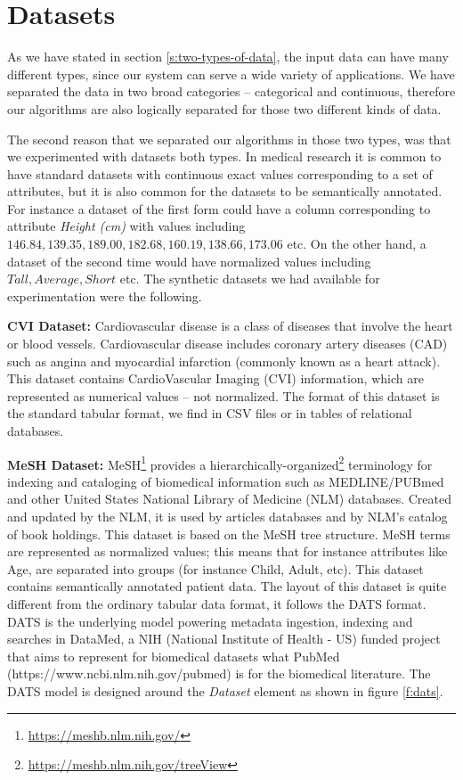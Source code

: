\section{Datasets  }\label{s:datasets}
As we have stated in section \ref{s:two-types-of-data}, the input data can have many different types, since our system can serve a wide variety of applications.
We have separated the data in two broad categories -- categorical and continuous, therefore our algorithms are also logically separated for those two different kinds of data.

The second reason that we separated our algorithms in those two types, was that we experimented with datasets both types.
In medical research it is common to have standard datasets with continuous exact values corresponding to a set of attributes, but it is also common for the datasets to be semantically annotated.
For instance a dataset of the first form could have a column corresponding to attribute \textit{Height (cm)} with values including $146.84, 139.35, 189.00, 182.68, 160.19, 138.66, 173.06$ etc.
On the other hand, a dataset of the second time would have normalized values including $Tall, Average, Short$ etc.
The synthetic datasets we had available for experimentation were the following.

\textbf{CVI Dataset:}
Cardiovascular disease is a class of diseases that involve the heart or blood vessels.
Cardiovascular disease includes coronary artery diseases (CAD) such as angina and myocardial infarction (commonly known as a heart attack).
This dataset contains CardioVascular Imaging (CVI) information, which are represented as numerical values – not normalized.
The format of this dataset is the standard tabular format, we find in CSV files or in tables of relational databases.

\textbf{MeSH Dataset:}
MeSH\footnote{\href{https://meshb.nlm.nih.gov/}{https://meshb.nlm.nih.gov/}} provides a hierarchically-organized\footnote{\href{https://meshb.nlm.nih.gov/treeView}{https://meshb.nlm.nih.gov/treeView}} terminology for indexing and cataloging of biomedical information such as MEDLINE/PUBmed and other United States National Library of Medicine (NLM) databases.
Created and updated by the NLM, it is used by articles databases and by NLM's catalog of book holdings.
This dataset is based on the MeSH tree structure.
MeSH terms are represented as normalized values; this means that for instance attributes like Age, are separated into groups (for instance Child, Adult, etc).
This dataset contains semantically annotated patient data.
The layout of this dataset is quite different from the ordinary tabular data format, it follows the DATS format.
DATS is the underlying model powering metadata ingestion, indexing and searches in DataMed, a NIH (National Institute of Health - US) funded project that aims to represent for biomedical datasets what PubMed (https://www.ncbi.nlm.nih.gov/pubmed) is for the biomedical literature.
The DATS model is designed around the \textit{Dataset} element as shown in figure \ref{f:dats}.



